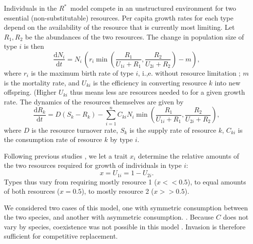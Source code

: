 \documentclass[a4paper,11pt]{article}
\newcommand{\verify}[1]{{\color{navy}{(verify: #1)}}}
\newcommand{\todo}[1]{{\color{navy}{(todo: #1)}}}
\newcommand{\ud}{\ensuremath{\mathrm{d}}}
\newcommand{\Rstar}{\ensuremath{R^*}}
\begin{document}
Individuals in the \Rstar\ model compete in an unstructured environment for two essential (non-substitutable) resources. Per capita growth rates for each type depend on the availability of the resource that is currently most limiting. Let $R_1, R_2$ be the abundances of the two resources. The change in population size of type $i$ is then
\begin{equation}
  \label{eq:rstar-n}
  \frac{\ud N_i}{\ud t} = N_i \, \left(r_i \min\left(\frac{R_1}{U_{1i} + R_1}, \frac{R_2}{U_{2i} + R_2}\right) - m\right),
\end{equation}
where $r_i$ is the maximum birth rate of type $i$, i.,e. without resource limitation \verify{(GJK) true?}; $m$ is the mortality rate, and $U_{ki}$ is the efficiency in converting resource $k$ into new offspring. (Higher $U_{ki}$ thus means less are resources needed to for a given growth rate. The dynamics of the resources themselves are given by
\begin{equation}
  \label{eq:rstar-r}
  \frac{\ud R_k}{\ud t} =
  D (S_k - R_k) - \sum_{i=1}^n {C_{ki} N_i
    \min\left(\frac{R_1}{U_{1i} + R_1}, \frac{R_2}{U_{2i} + R_2}\right)},
\end{equation}
where $D$ is the resource turnover rate, $S_k$ is the supply rate of resource $k$, $C_{ki}$ is the consumption rate \verify{ (GJK) consumption rate or resource content?} of resource $k$ by type $i$. 
\todo{(GJK) previous text discussed setting C= U, is this still relevant?} 
\todo{(GJK) previous text said C did not vary among species. Should we mention that here? }

Following previous studies \citep{Tilman-1985, Schreiber-2003, Fox-2008}, we let a trait $x_i$ determine the relative amounts of the two resources required for growth of individuals in type $i$: \begin{equation}
\label{eq:R3}
x = U_{1i} = 1 - U_{2i}.
\end{equation}
Types thus vary from requiring mostly resource 1 ($x << 0.5$), to equal amounts of both resources ($x = 0.5$), to mostly resource 2 ($x >> 0.5$).

We considered two cases of this model, one with symmetric consumption \verify{(GJK) or content?} between the two species, and another with asymmetric consumption. \verify{(GJK) What does this mean? Is it symmetric across species or with respect to resources?}. \verify{(GJK) Are symmetric and asymmetric cases both important?} Because $C$ does not vary by species, coexistence was not possible in this model \citep{Tilman-1982}. Invasion is therefore sufficient for competitive replacement.
\end{document}
